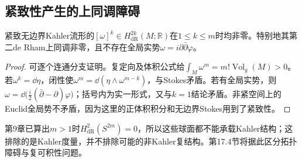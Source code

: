 \subsection{紧致性产生的上同调障碍}
\begin{proposition}\label{prop:kahler-powers}
紧致无边界Kahler流形的$[\omega]^k\in H^{2k}_{\mathrm{dR}}(M;\mathbb R)$在$1\leq k\leq m$时均非零。特别地其第二de Rham上同调非零，且不存在全局实势$\omega=i\partial\bar\partial\varphi$。
\end{proposition}
\begin{proof}
可逐个连通分支证明。复定向及体积公式给$\int_M\omega^m=m!\operatorname{Vol}_g(M)>0$。若$\omega^k=\dd\eta$，闭性使$\omega^m=\dd(\eta\wedge\omega^{m-k})$，与Stokes矛盾。若有全局实势，则$\omega=\dd\bigl(\tfrac i2(\bar\partial-\partial)\varphi\bigr)$；括号内为实一形式，又与$k=1$结论矛盾。非紧空间上的Euclid全局势不矛盾，因为这里的正体积积分和无边界Stokes用到了紧致性。
\end{proof}
第9章已算出$m>1$时$H^2_{\mathrm{dR}}(S^{2m})=0$，所以这些球面都不能承载Kahler结构；这排除的是Kahler度量，并不排除可能的非Kahler复结构。第17.4节将据此区分拓扑障碍与复可积性问题。
